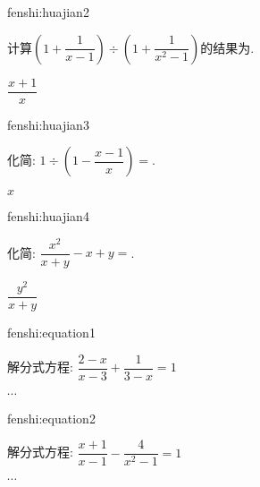 \begin{defproblem}{fenshi:huajian2}%
\begin{onlyproblem}%
计算$\left(1+\dfrac{1}{x-1}\right)\div\left(1+\dfrac{1}{x^2-1}\right)$的结果为\underline{\hspace*{1cm}}.
\end{onlyproblem}%
\begin{onlysolution}%
$\dfrac{x+1}{x}$
\end{onlysolution}%
\end{defproblem}

\begin{defproblem}{fenshi:huajian3}%
\begin{onlyproblem}%
化简:
$1\div\left(1-\dfrac{x-1}{x}\right)=$\underline{\hspace*{2cm}}.
\end{onlyproblem}%
\begin{onlysolution}%
$x$
\end{onlysolution}%
\end{defproblem}

\begin{defproblem}{fenshi:huajian4}%
\begin{onlyproblem}%
化简:
$\dfrac{x^2}{x+y}-x+y=$\underline{\hspace*{2cm}}.
\end{onlyproblem}%
\begin{onlysolution}%
$\dfrac{y^2}{x+y}$
\end{onlysolution}%
\end{defproblem}



\begin{defproblem}{fenshi:equation1}%
\begin{onlyproblem}%
解分式方程:
$\dfrac{2-x}{x-3}+\dfrac{1}{3-x}=1$
\end{onlyproblem}%
\begin{onlysolution}%
$\cdots$
\end{onlysolution}%
\end{defproblem}


\begin{defproblem}{fenshi:equation2}%
\begin{onlyproblem}%
解分式方程:
$\dfrac{x+1}{x-1}-\dfrac{4}{x^2-1}=1$
\end{onlyproblem}%
\begin{onlysolution}%
$\cdots$
\end{onlysolution}%
\end{defproblem}


